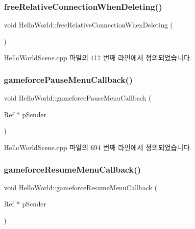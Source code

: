 \subsubsection{\texorpdfstring{free\+Relative\+Connection\+When\+Deleting()}{freeRelativeConnectionWhenDeleting()}}
{\footnotesize\ttfamily void Hello\+World\+::free\+Relative\+Connection\+When\+Deleting (\begin{DoxyParamCaption}{ }\end{DoxyParamCaption})\hspace{0.3cm}{\ttfamily [protected]}}



Hello\+World\+Scene.\+cpp 파일의 417 번째 라인에서 정의되었습니다.

\mbox{\label{class_hello_world_ac202dde4f557f0b9b6c3d150da4eec65}} 
\subsubsection{\texorpdfstring{gameforce\+Pause\+Menu\+Callback()}{gameforcePauseMenuCallback()}}
{\footnotesize\ttfamily void Hello\+World\+::gameforce\+Pause\+Menu\+Callback (\begin{DoxyParamCaption}\item[{Ref $\ast$}]{p\+Sender }\end{DoxyParamCaption})}



Hello\+World\+Scene.\+cpp 파일의 694 번째 라인에서 정의되었습니다.

\mbox{\label{class_hello_world_a9765d6e42b96bcf6c025ae1905bd7a90}} 
\subsubsection{\texorpdfstring{gameforce\+Resume\+Menu\+Callback()}{gameforceResumeMenuCallback()}}
{\footnotesize\ttfamily void Hello\+World\+::gameforce\+Resume\+Menu\+Callback (\begin{DoxyParamCaption}\item[{Ref $\ast$}]{p\+Sender }\end{DoxyParamCaption})}




